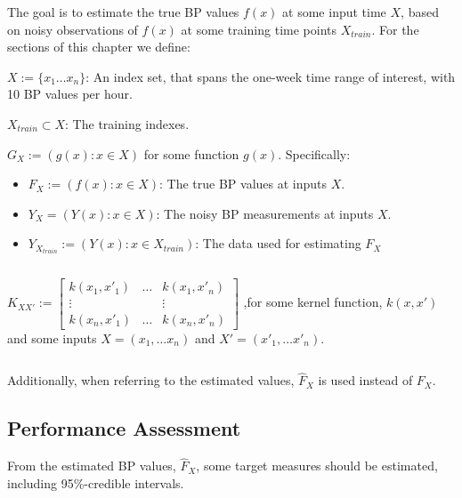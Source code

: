 The goal is to estimate the true BP values $f(x)$ at some input time $X$,
based on noisy observations of $f(x)$ at some training time points $X_{train}$.
For the sections of this chapter we define:
\begin{description}
    \item $X := \{ x_1 \dots x_n \}$: An index set, that spans
    the one-week time range of interest, with 10 BP values per hour.\\

    \item $X_{train} \subset X$: The training indexes. \\

    \item $G_X := (g(x) : x \in X )$ for some function $g(x)$.
    Specifically:
    \begin{itemize}
        \item $F_X := (f(x) : x \in X )$: The true BP values at inputs $X$.
        \item $Y_X= (Y(x) : x \in X )$: The noisy BP measurements at inputs $X$.
        \item $Y_{X_{train}} := (Y(x) : x \in X_{train})$: The data used for estimating $F_X$
    \end{itemize}
    
    \item $\text{ }$\\

    \item $K_{XX'} := \begin{bmatrix}
            k(x_1, x'_1) & \dots & k(x_1, x'_n)\\
            \vdots  &  & \vdots \\
            k(x_n, x'_1) & \dots  & k(x_n, x'_n)
         \end{bmatrix}$ ,for some kernel function, $k(x, x')$ \\

        and some inputs $X=(x_1, \dots x_n)$ and $X'=(x'_1, \dots x'_n)$.
    \item $\text{ }$\\
\end{description}

Additionally, when referring to the estimated values,
$\hat{F}_X$ is used instead of $F_X$.


\subsection{Performance Assessment}
From the estimated BP values, $\hat{F}_X$, some target measures
should be estimated, including 95\%-credible intervals.

